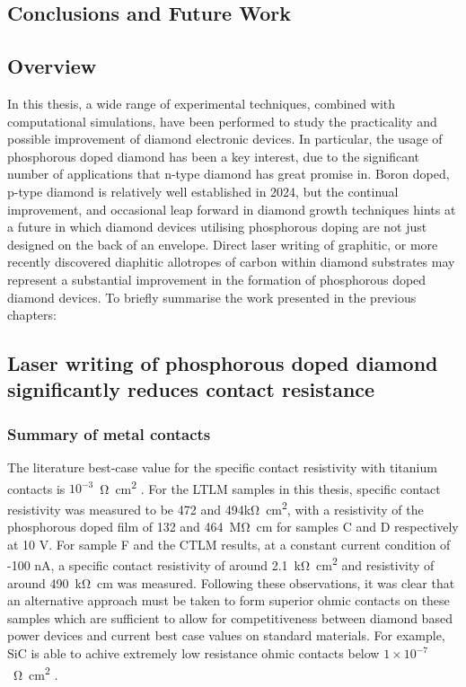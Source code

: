 \begin{refsection}
\chapter{Conclusions and Future Work}
\label{ch:conclusions}
\section{Overview}
In this thesis, a wide range of experimental techniques, combined with computational simulations, have been performed to study the practicality and possible improvement of diamond electronic devices. In particular, the usage of phosphorous doped diamond has been a key interest, due to the significant number of applications that n-type diamond has great promise in. Boron doped, p-type diamond is relatively well established in 2024, but the continual improvement, and occasional leap forward in diamond growth techniques hints at a future in which diamond devices utilising phosphorous doping are not just designed on the back of an envelope. Direct laser writing of graphitic, or more recently discovered diaphitic allotropes of carbon within diamond substrates may represent a substantial improvement in the formation of phosphorous doped diamond devices. To briefly summarise the work presented in the previous chapters:

\section{Laser writing of phosphorous doped diamond significantly reduces contact resistance}

\subsection{Summary of metal contacts}
The literature best-case value for the specific contact resistivity with titanium contacts is $10^{-3}$~\si{\ohm\centi\metre\squared} \cite{matsumoto2013}. For the LTLM samples in this thesis, specific contact resistivity was measured to be 472 and 494\si{\kilo\ohm\centi\metre\squared}, with a resistivity of the phosphorous doped film of 132 and 464~\si{\mega\ohm\centi\metre} for samples C and D respectively at 10 V. For sample F and the CTLM results, at a constant current condition of -100 \si{\nano\ampere}, a specific contact resistivity of around 2.1~\si{\kilo\ohm\centi\metre\squared} and resistivity of around 490~\si{\kilo\ohm\centi\metre} was measured. Following these observations, it was clear that an alternative approach must be taken to form superior ohmic contacts on these samples which are sufficient to allow for competitiveness between diamond based power devices and current best case values on standard materials. For example, SiC is able to achive extremely low resistance ohmic contacts below $1\times10^{-7}$~\si{\ohm\centi\metre\squared} \cite{pan2013}. 


\end{refsection}
